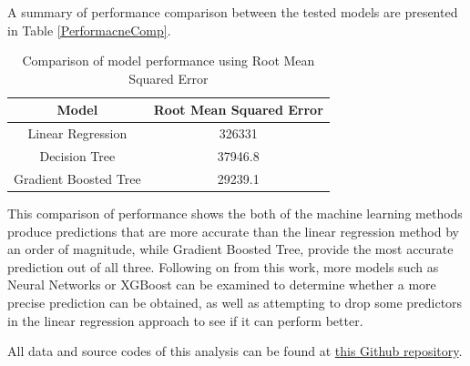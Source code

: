 \documentclass[11pt,a4paper,titlepage]{article}
\begin{document}
A summary of performance comparison between the tested models are presented in Table \ref{PerformacneComp}.

\begin{table}[htbp!]
    \begin{center}
        \begin{tabular}{ |c|c| } 
        \hline
        Model & Root Mean Squared Error \\ 
        \hline
        Linear Regression & 326331 \\
        Decision Tree & 37946.8 \\
        Gradient Boosted Tree & 29239.1 \\
        \hline
        \end{tabular}
        \caption{Comparison of model performance using Root Mean Squared Error}
        \label{PerformanceComp}
    \end{center}
\end{table}

This comparison of performance shows the both of the machine learning methods produce predictions that are more accurate than the linear regression method by an order of magnitude, while Gradient Boosted Tree, provide the most accurate prediction out of all three. Following on from this work, more models such as Neural Networks or XGBoost can be examined to determine whether a more precise prediction can be obtained, as well as attempting to drop some predictors in the linear regression approach to see if it can perform better.

All data and source codes of this analysis can be found at \href{https://github.com/jasonyctam/-WorldBankClimateChange_PySpark}{this Github repository}.
\end{document}
